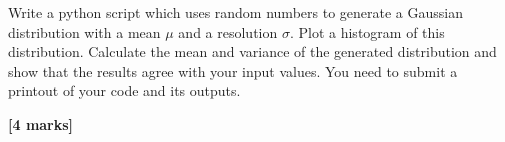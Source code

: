 \begin{enumerate}
Write a python script which uses random numbers to generate a Gaussian distribution with a mean $\mu$ and a resolution $\sigma$.
Plot a histogram of  this distribution.
Calculate the mean and variance  of the generated distribution and show 
that the results agree with your input values.
You need to submit a printout of your code and its outputs.

\hfill {\bf [4 marks]}

\end{enumerate}
